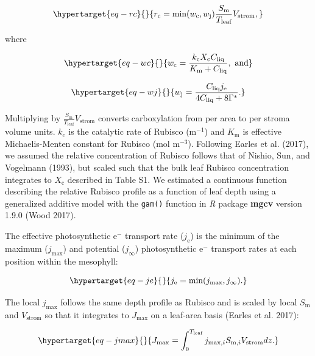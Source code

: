 \documentclass[
  letterpaper,
  DIV=11,
  numbers=noendperiod]{scrartcl}
\begin{document}
\begin{equation}\protect\hypertarget{eq-rc}{}{ r_\text{c} = \text{min}(w_\text{c}, w_\text{j}) \frac{S_\text{m}}{T_\text{leaf}} V_\text{strom}, }\label{eq-rc}\end{equation}

where

\begin{equation}\protect\hypertarget{eq-wc}{}{ w_\text{c} = \frac{k_\text{c} X_\text{c} C_\text{liq}}{K_\text{m} + C_\text{liq}},~\text{and}}\label{eq-wc}\end{equation}

\begin{equation}\protect\hypertarget{eq-wj}{}{ w_\text{j} = \frac{C_\text{liq} j_\text{e}}{4 C_\text{liq} + 8 \Gamma^*}.}\label{eq-wj}\end{equation}

Multiplying by \(\frac{S_\text{m}}{T_\text{leaf}} V_\text{strom}\)
converts carboxylation from per area to per stroma volume units.
\(k_\text{c}\) is the catalytic rate of Rubisco (m\(^{-1}\)) and
\(K_\text{m}\) is effective Michaelis-Menten constant for Rubisco (mol
m\(^{-3}\)). Following Earles et al. (2017), we assumed the relative
concentration of Rubisco follows that of Nishio, Sun, and Vogelmann
(1993), but scaled such that the bulk leaf Rubisco concentration
integrates to \(X_\text{c}\) described in Table S1. We estimated a
continuous function describing the relative Rubisco profile as a
function of leaf depth using a generalized additive model with the
\texttt{gam()} function in \emph{R} package \textbf{mgcv} version 1.9.0
(Wood 2017).

The effective photosynthetic e\(^{-}\) transport rate (\(j_\text{e}\))
is the minimum of the maximum (\(j_\text{max}\)) and potential
(\(j_\infty\)) photosynthetic e\(^{-}\) transport rates at each position
within the mesophyll:

\begin{equation}\protect\hypertarget{eq-je}{}{ j_\text{e} = \text{min}(j_\text{max}, j_\infty). }\label{eq-je}\end{equation}

The local \(j_\text{max}\) follows the same depth profile as Rubisco and
is scaled by local \(S_\text{m}\) and \(V_\text{strom}\) so that it
integrates to \(J_\text{max}\) on a leaf-area basis (Earles et al.
2017):

\begin{equation}\protect\hypertarget{eq-jmax}{}{J_\text{max} = \int_0^{T_\text{leaf}} j_{\text{max},i} S_{\text{m},i} V_\text{strom} dz.}\label{eq-jmax}\end{equation}
\end{document}
